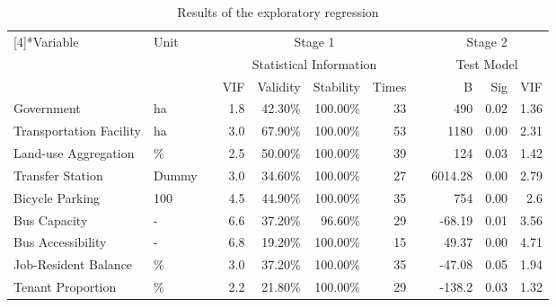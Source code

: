 \begin{sidewaystable}[htbp]
	\centering
	\caption{Results of the exploratory regression}
	\label{tab:chp4:ExploratoryRegression}%
	\small
	\renewcommand{\arraystretch}{1.25} %
	\begin{tabular}{llrrrrrcrrr}
		\Xhline{1.5pt}
		
		\multirow{3}[4]{*}{Variable} & \multirow{3}[4]{*}{Unit} & & \multicolumn{4}{c}{Stage 1} & & \multicolumn{3}{c}{Stage 2} \\
		
		& & & \multicolumn{4}{c}{Statistical Information} & & \multicolumn{3}{c}{Test Model} \\
		
		\cmidrule{4-7} \cmidrule{9-11}
		
		& & & VIF & Validity & Stability & Times & & B & Sig & VIF \\
		
		\cmidrule{1-2}\cmidrule{4-7}\cmidrule{9-11}
		
		Government & ha & & 1.8 & 42.30\% & 100.00\% & 33 & & 490 & 0.02  & 1.36 \\
		Transportation Facility & ha & & 3.0 & 67.90\% & 100.00\% & 53 & & 1180 & 0.00 & 2.31 \\
		
		Land-use Aggregation & \% & & 2.5 & 50.00\% & 100.00\% & 39 & & 124 & 0.03 & 1.42 \\
		
		Transfer Station & Dummy & & 3.0 & 34.60\% & 100.00\% & 27 & & 6014.28 & 0.00 & 2.79 \\
		
		Bicycle Parking & 100 & & 4.5 & 44.90\% & 100.00\% & 35 & & 754 & 0.00 & 2.6 \\
		
		Bus Capacity & - & & 6.6 & 37.20\% & 96.60\% & 29 & & -68.19 & 0.01 & 3.56 \\
		
		Bus Accessibility & - & & 6.8 & 19.20\% & 100.00\% & 15 & & 49.37 & 0.00 & 4.71 \\
		
		Job-Resident Balance & \% & & 3.0 & 37.20\% & 100.00\% & 35 & & -47.08 & 0.05  & 1.94 \\
		
		Tenant Proportion & \% & & 2.2 & 21.80\% & 100.00\% & 29 & & -138.2 & 0.03  & 1.32 \\
		

\end{tabular}
\end{sidewaystable}

